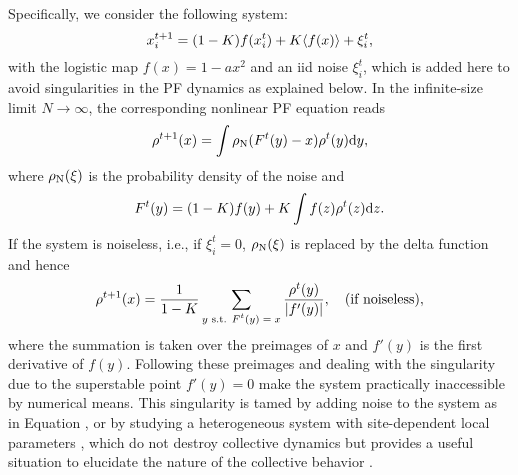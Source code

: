 \documentclass[12pt]{iopart}
\begin{document}
Specifically, we consider the following system:
\begin{equation}
 x_i^{t+1} = (1-K)f(x_i^t) + K \langle f(x) \rangle + \xi_i^t,  \label{eq:GCMDef}
\end{equation}
 with the logistic map $f(x) = 1-ax^2$
 and an iid noise $\xi_i^t$,
 which is added here to avoid singularities in the PF dynamics
 as explained below.
In the infinite-size limit $N \to \infty$,
 the corresponding nonlinear PF equation reads
\begin{equation}
 \rho^{t+1}(x) = \int \rho_{\rm N}(F^t(y) - x) \rho^t(y) \mathrm{d} y,  \label{eq:PFDef1}
\end{equation}
 where $\rho_{\rm N}(\xi)$ is the probability density of the noise and
\begin{equation}
 F^t(y) = (1-K)f(y) + K \int f(z)\rho^t(z) \mathrm{d} z.  \label{eq:PFDef2}
\end{equation}
If the system is noiseless, i.e., if $\xi_i^t = 0$,
 $\rho_{\rm N}(\xi)$ is replaced by the delta function
 and hence
\begin{equation}
 \rho^{t+1}(x) = \frac{1}{1-K} \sum_\textrm{\scriptsize $y$ s.t. $F^t(y) = x$} \frac{\rho^t(y)}{|f'(y)|}, \quad (\textrm{if noiseless}),  \label{eq:PFNoiseless}
\end{equation}
 where the summation is taken over the preimages of $x$
 and $f'(y)$ is the first derivative of $f(y)$.
Following these preimages and dealing with the singularity
 due to the superstable point $f'(y) = 0$
 make the system practically inaccessible by numerical means.
This singularity is tamed by adding noise to the system
 as in Equation ,
 or by studying a heterogeneous system with site-dependent
 local parameters \cite{Shibata.Kaneko-PRL1998,Cencini.etal-PD1999},
 which do not destroy collective dynamics
 but provides a useful situation
 to elucidate the nature of the collective behavior
 \cite{Shibata.etal-PRL1999,DeMonte.etal-PRL2004,DeMonte.etal-PTPS2006}.
\end{document}
